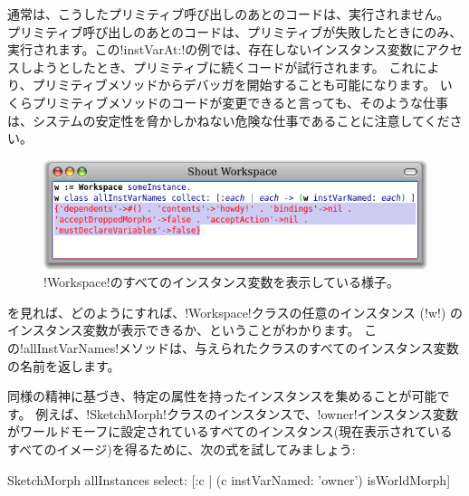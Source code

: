 \documentclass[a4paper,10pt,twoside]{book}
\begin{document}
通常は、こうしたプリミティブ呼び出しのあとのコードは、実行されません。
プリミティブ呼び出しのあとのコードは、プリミティブが失敗したときにのみ、実行されます。この\ct!instVarAt:!の例では、存在しないインスタンス変数にアクセスしようとしたとき、プリミティブに続くコードが試行されます。
これにより、プリミティブメソッドからデバッガを開始することも可能になります。
いくらプリミティブメソッドのコードが変更できると言っても、そのような仕事は、\pharo システムの安定性を脅かしかねない危険な仕事であることに注意してください。%

\begin{figure}[ht]\centering
	\includegraphics[width=\linewidth]{allInstanceVariables}
	\caption{\ct!Workspace!のすべてのインスタンス変数を表示している様子。}
\end{figure}

を見れば、どのようにすれば、\ct!Workspace!クラスの任意のインスタンス (\ct!w!) のインスタンス変数が表示できるか、ということがわかります。
この\ct!allInstVarNames!メソッドは、与えられたクラスのすべてのインスタンス変数の名前を返します。

同様の精神に基づき、特定の属性を持ったインスタンスを集めることが可能です。%
例えば、\ct!SketchMorph!クラスのインスタンスで、\ct!owner!インスタンス変数がワールドモーフに設定されているすべてのインスタンス(\ie 現在表示されているすべてのイメージ)を得るために、次の式を試してみましょう:
\begin{code}{}
SketchMorph allInstances select: [:c | (c instVarNamed: 'owner') isWorldMorph]
\end{code}
\end{document}
